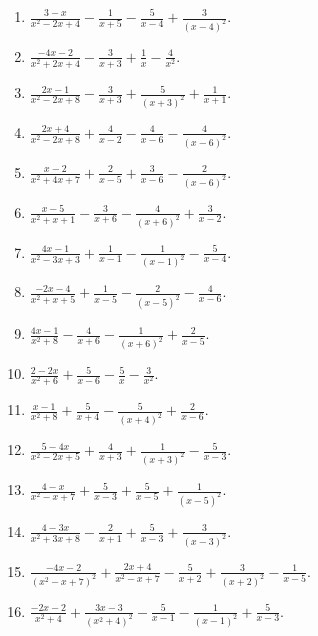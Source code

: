 \documentclass[11pt,oneside]{book}
\begin{document}
\begin{enumerate}[leftmargin=*,label=\textbf{Y\arabic*.},itemsep=0.45\baselineskip]
\item $\displaystyle \frac{3 - x}{x^{2} - 2 x + 4} - \frac{1}{x + 5} - \frac{5}{x - 4} + \frac{3}{\left(x - 4\right)^{2}}$.
\item $\displaystyle \frac{- 4 x - 2}{x^{2} + 2 x + 4} - \frac{3}{x + 3} + \frac{1}{x} - \frac{4}{x^{2}}$.
\item $\displaystyle \frac{2 x - 1}{x^{2} - 2 x + 8} - \frac{3}{x + 3} + \frac{5}{\left(x + 3\right)^{2}} + \frac{1}{x + 1}$.
\item $\displaystyle \frac{2 x + 4}{x^{2} - 2 x + 8} + \frac{4}{x - 2} - \frac{4}{x - 6} - \frac{4}{\left(x - 6\right)^{2}}$.
\item $\displaystyle \frac{x - 2}{x^{2} + 4 x + 7} + \frac{2}{x - 5} + \frac{3}{x - 6} - \frac{2}{\left(x - 6\right)^{2}}$.
\item $\displaystyle \frac{x - 5}{x^{2} + x + 1} - \frac{3}{x + 6} - \frac{4}{\left(x + 6\right)^{2}} + \frac{3}{x - 2}$.
\item $\displaystyle \frac{4 x - 1}{x^{2} - 3 x + 3} + \frac{1}{x - 1} - \frac{1}{\left(x - 1\right)^{2}} - \frac{5}{x - 4}$.
\item $\displaystyle \frac{- 2 x - 4}{x^{2} + x + 5} + \frac{1}{x - 5} - \frac{2}{\left(x - 5\right)^{2}} - \frac{4}{x - 6}$.
\item $\displaystyle \frac{4 x - 1}{x^{2} + 8} - \frac{4}{x + 6} - \frac{1}{\left(x + 6\right)^{2}} + \frac{2}{x - 5}$.
\item $\displaystyle \frac{2 - 2 x}{x^{2} + 6} + \frac{5}{x - 6} - \frac{5}{x} - \frac{3}{x^{2}}$.
\item $\displaystyle \frac{x - 1}{x^{2} + 8} + \frac{5}{x + 4} - \frac{5}{\left(x + 4\right)^{2}} + \frac{2}{x - 6}$.
\item $\displaystyle \frac{5 - 4 x}{x^{2} - 2 x + 5} + \frac{4}{x + 3} + \frac{1}{\left(x + 3\right)^{2}} - \frac{5}{x - 3}$.
\item $\displaystyle \frac{4 - x}{x^{2} - x + 7} + \frac{5}{x - 3} + \frac{5}{x - 5} + \frac{1}{\left(x - 5\right)^{2}}$.
\item $\displaystyle \frac{4 - 3 x}{x^{2} + 3 x + 8} - \frac{2}{x + 1} + \frac{5}{x - 3} + \frac{3}{\left(x - 3\right)^{2}}$.
\item $\displaystyle \frac{- 4 x - 2}{\left(x^{2} - x + 7\right)^{2}} + \frac{2 x + 4}{x^{2} - x + 7} - \frac{5}{x + 2} + \frac{3}{\left(x + 2\right)^{2}} - \frac{1}{x - 5}$.
\item $\displaystyle \frac{- 2 x - 2}{x^{2} + 4} + \frac{3 x - 3}{\left(x^{2} + 4\right)^{2}} - \frac{5}{x - 1} - \frac{1}{\left(x - 1\right)^{2}} + \frac{5}{x - 3}$.

\end{enumerate}
\end{document}
